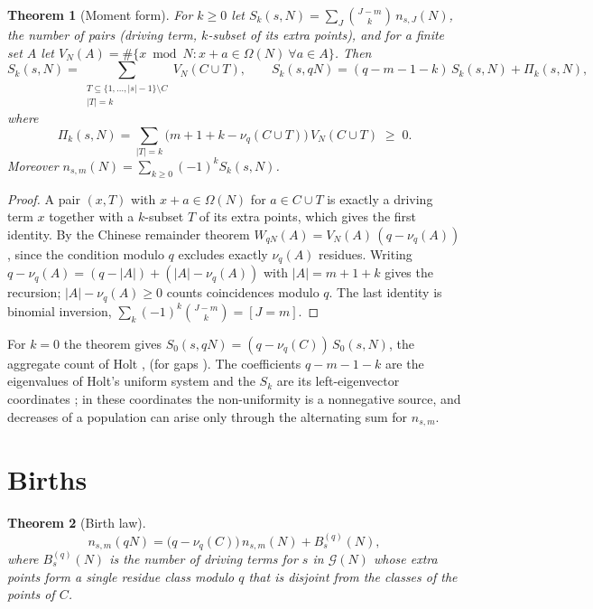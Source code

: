 \documentclass[11pt]{article}
\newtheorem{theorem}{Theorem}[section]
\theoremstyle{definition}
\theoremstyle{remark}
\newcommand{\G}{\mathcal{G}}
\begin{document}
\begin{theorem}[Moment form]\label{thm:moments}
For $k \ge 0$ let $S_k(s, N) = \sum_J \binom{J - m}{k}\, n_{s,J}(N)$, the number of pairs (driving term, $k$-subset of its extra points), and for a finite set $A$ let $V_N(A) = \#\{x \bmod N : x + a \in \Omega(N)\ \forall a \in A\}$. Then
\[
  S_k(s, N) = \sum_{\substack{T \subseteq \{1, \dots, |s|-1\} \setminus C\\ |T| = k}} V_N(C \cup T),
  \qquad
  S_k(s, qN) = (q - m - 1 - k)\, S_k(s, N) + \Pi_k(s, N),
\]
where
\[
  \Pi_k(s, N) = \sum_{|T| = k} \big( m + 1 + k - \nu_q(C \cup T) \big)\, V_N(C \cup T) \;\ge\; 0 .
\]
Moreover $n_{s,m}(N) = \sum_{k \ge 0} (-1)^k S_k(s, N)$.
\end{theorem}

\begin{proof}
A pair $(x, T)$ with $x + a \in \Omega(N)$ for $a \in C \cup T$ is exactly a driving term $x$ together with a $k$-subset $T$ of its extra points, which gives the first identity. By the Chinese remainder theorem $W_{qN}(A) = V_N(A)\,(q - \nu_q(A))$, since the condition modulo $q$ excludes exactly $\nu_q(A)$ residues. Writing $q - \nu_q(A) = (q - |A|) + (|A| - \nu_q(A))$ with $|A| = m + 1 + k$ gives the recursion; $|A| - \nu_q(A) \ge 0$ counts coincidences modulo $q$. The last identity is binomial inversion, $\sum_k (-1)^k \binom{J-m}{k} = [J = m]$.
\end{proof}

For $k = 0$ the theorem gives $S_0(s, qN) = (q - \nu_q(C))\, S_0(s, N)$, the aggregate count of Holt \cite[Cor.~1.2]{Ho25}, \cite[Thm.~1.1, Lemma~2.7]{Ho26} (for gaps \cite[Cor.~5.3]{HR15}). The coefficients $q - m - 1 - k$ are the eigenvalues of Holt's uniform system and the $S_k$ are its left-eigenvector coordinates \cite[\S3]{Ho26}; in these coordinates the non-uniformity is a nonnegative source, and decreases of a population can arise only through the alternating sum for $n_{s,m}$.

\section{Births}\label{sec:births}

\begin{theorem}[Birth law]\label{thm:birth}
\[
  n_{s,m}(qN) = \big(q - \nu_q(C)\big)\, n_{s,m}(N) + B^{(q)}_s(N),
\]
where $B^{(q)}_s(N)$ is the number of driving terms for $s$ in $\G(N)$ whose extra points form a single residue class modulo $q$ that is disjoint from the classes of the points of $C$.
\end{theorem}
\end{document}
